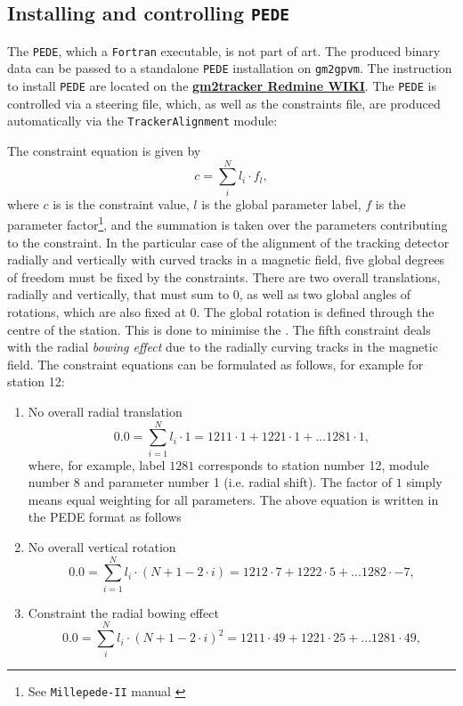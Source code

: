 \documentclass[12pt]{article}
\begin{document}
\subsection{Installing and controlling \texttt{PEDE}} 
The \texttt{PEDE}, which a \texttt{Fortran} executable, is not part of art. The produced binary data can be passed to a standalone \texttt{PEDE} installation on \texttt{gm2gpvm}. The instruction to install \texttt{PEDE} are located on the \textbf{\href{https://cdcvs.fnal.gov/redmine/projects/gm2tracker/wiki/Tracker_Alignment_MC_with_Millipede_II_Framework}{gm2tracker Redmine WIKI}}. 
The \texttt{PEDE} is controlled via a steering file, which, as well as the constraints file, are produced automatically via the \verb!TrackerAlignment! module:

\clearpage

The constraint equation is given by
\begin{equation}
        c = \sum_i^N l_i\cdot f_l,
\end{equation}
where $c$ is is the constraint value, $l$ is the global parameter label, $f$ is the parameter factor\footnote{See \texttt{Millepede-II} manual \cite{mp2}}, and the summation is taken over the parameters contributing to the constraint. In the particular case of the alignment of the tracking detector radially and vertically with curved tracks in a magnetic field, five global degrees of freedom must be fixed by the constraints. There are two overall translations, radially and vertically, that must sum to 0, as well as two global angles of rotations, which are also fixed at 0. The global rotation is defined through the centre of the station. This is done to minimise the . The fifth constraint deals with the radial \textit{bowing effect} due to the radially curving tracks in the magnetic field. The constraint equations can be formulated as follows, for example for station 12:
\begin{enumerate}
    \item No overall radial translation
    \begin{equation}
        0.0 = \sum_{i=1}^N l_i\cdot 1 = 1211 \cdot 1 + 1221 \cdot 1 + ... 1281 \cdot 1,
    \end{equation}
    where, for example, label $1281$ corresponds to station number 12, module number 8 and parameter number 1 (i.e. radial shift). The factor of $1$ simply means equal weighting for all parameters. The above equation is written in the PEDE format as follows
    
    \item No overall vertical rotation
    \begin{equation}
        0.0 = \sum_{i=1}^N l_i\cdot (N+1-2\cdot i)  = 1212 \cdot 7 + 1222 \cdot 5 + ... 1282 \cdot -7,
    \end{equation}
    
    \item Constraint the radial bowing effect
     \begin{equation}
        0.0 = \sum_i^N l_i\cdot (N+1-2\cdot i)^2 = 1211 \cdot 49 + 1221 \cdot 25 + ... 1281 \cdot 49, \label{eq:bowing}
    \end{equation}
    
\end{enumerate}
\end{document}
